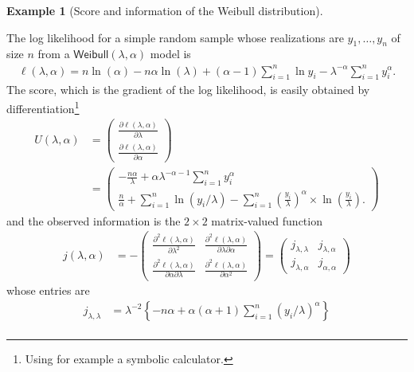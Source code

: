 \documentclass[
  11pt,
  letterpaper,
]{scrbook}
\theoremstyle{plain}
\theoremstyle{definition}
\newtheorem{example}{Example}[chapter]
\theoremstyle{definition}
\theoremstyle{plain}
\theoremstyle{remark}
\begin{document}
\begin{example}[Score and information of the Weibull
distribution]\protect\hypertarget{exm-weibull-info}{}\label{exm-weibull-info}

The log likelihood for a simple random sample whose realizations are
\(y_1, \ldots, y_n\) of size \(n\) from a
\(\mathsf{Weibull}(\lambda, \alpha)\) model is \begin{align*}
\ell(\lambda, \alpha) = n \ln(\alpha) - n\alpha\ln(\lambda) + (\alpha-1) \sum_{i=1}^n \ln y_i  - \lambda^{-\alpha}\sum_{i=1}^n y_i^\alpha.
\end{align*} The score, which is the gradient of the log likelihood, is
easily obtained by differentiation\footnote{Using for example a symbolic
  calculator.} \begin{align*}
U(\lambda, \alpha) &= \begin{pmatrix}\frac{\partial \ell(\lambda, \alpha)}{\partial \lambda} \\
\frac{\partial \ell(\lambda, \alpha)}{\partial \alpha} \end{pmatrix} \\&= 
\begin{pmatrix}
 -\frac{n\alpha}{\lambda} +\alpha\lambda^{-\alpha-1}\sum_{i=1}^n y_i^\alpha
 \\
 \frac{n}{\alpha} + \sum_{i=1}^n \ln (y_i/\lambda)  - \sum_{i=1}^n \left(\frac{y_i}{\lambda}\right)^{\alpha} \times\ln\left(\frac{y_i}{\lambda}\right).
 \end{pmatrix}
\end{align*} and the observed information is the \(2 \times 2\)
matrix-valued function \begin{align*}
j(\lambda, \alpha) &= - \begin{pmatrix}
\frac{\partial^2 \ell(\lambda, \alpha)}{\partial \lambda^2} &  \frac{\partial^2 \ell(\lambda, \alpha)}{\partial \lambda \partial \alpha} \\ \frac{\partial^2 \ell(\lambda, \alpha)}{\partial \alpha \partial \lambda} & \frac{\partial^2 \ell(\lambda, \alpha)}{\partial \alpha^2}
\end{pmatrix}  = \begin{pmatrix} j_{\lambda, \lambda} & j_{\lambda, \alpha} \\ j_{\lambda, \alpha} & j_{\alpha, \alpha} \end{pmatrix}
\end{align*} whose entries are \begin{align*}
j_{\lambda, \lambda} &= \lambda^{-2}\left\{-n\alpha + \alpha(\alpha+1)\sum_{i=1}^n (y_i/\lambda)^\alpha\right\} \\

\end{align*}
\end{example}
\end{document}
